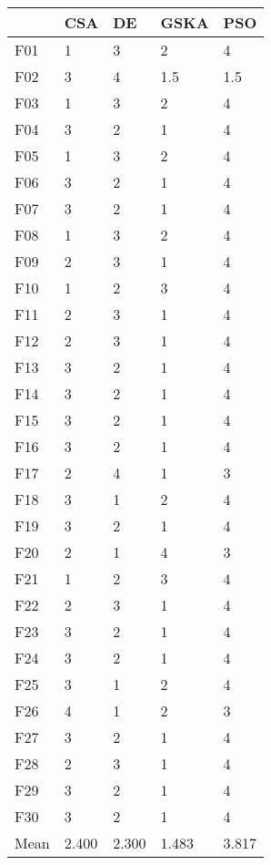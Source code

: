 \begin{tabular}{lllll}
\toprule
{} &    CSA &     DE &   GSKA &    PSO \\
\midrule
F01  &      1 &      3 &      2 &      4 \\
F02  &      3 &      4 &    1.5 &    1.5 \\
F03  &      1 &      3 &      2 &      4 \\
F04  &      3 &      2 &      1 &      4 \\
F05  &      1 &      3 &      2 &      4 \\
F06  &      3 &      2 &      1 &      4 \\
F07  &      3 &      2 &      1 &      4 \\
F08  &      1 &      3 &      2 &      4 \\
F09  &      2 &      3 &      1 &      4 \\
F10  &      1 &      2 &      3 &      4 \\
F11  &      2 &      3 &      1 &      4 \\
F12  &      2 &      3 &      1 &      4 \\
F13  &      3 &      2 &      1 &      4 \\
F14  &      3 &      2 &      1 &      4 \\
F15  &      3 &      2 &      1 &      4 \\
F16  &      3 &      2 &      1 &      4 \\
F17  &      2 &      4 &      1 &      3 \\
F18  &      3 &      1 &      2 &      4 \\
F19  &      3 &      2 &      1 &      4 \\
F20  &      2 &      1 &      4 &      3 \\
F21  &      1 &      2 &      3 &      4 \\
F22  &      2 &      3 &      1 &      4 \\
F23  &      3 &      2 &      1 &      4 \\
F24  &      3 &      2 &      1 &      4 \\
F25  &      3 &      1 &      2 &      4 \\
F26  &      4 &      1 &      2 &      3 \\
F27  &      3 &      2 &      1 &      4 \\
F28  &      2 &      3 &      1 &      4 \\
F29  &      3 &      2 &      1 &      4 \\
F30  &      3 &      2 &      1 &      4 \\
Mean &  2.400 &  2.300 &  1.483 &  3.817 \\
\bottomrule
\end{tabular}
